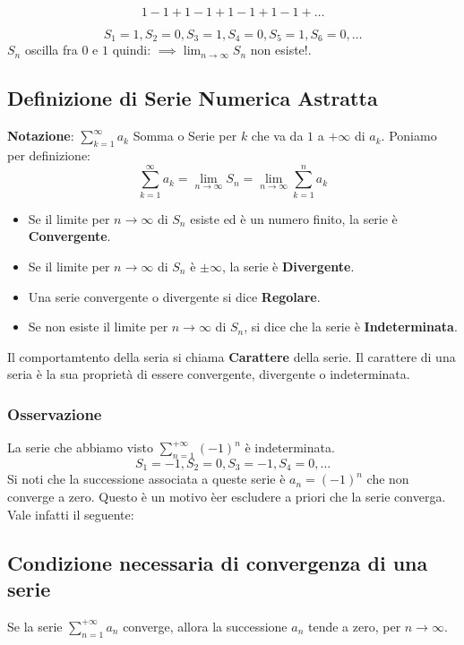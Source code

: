 \documentclass[../../main.tex]{subfiles}
\begin{document}
\[
    1-1+1-1+1-1+1-1+\ldots
\]

\[
    S_1 = 1, S_2 = 0, S_3 = 1, S_4 = 0, S_5 = 1, S_6 = 0, \ldots
\]
$S_n$ oscilla fra $0$ e $1$ quindi: $\implies \lim_{n\to\infty}S_n$ non esiste!.

\subsection{Definizione di Serie Numerica Astratta}
\textbf{Notazione}: $\sum_{k=1}^\infty a_k$ Somma o Serie per $k$ che va da $1$ a
$+\infty$ di $a_k$. Poniamo per definizione:
\[
    \sum_{k=1}^\infty a_k = \lim_{n\to\infty}S_n = \lim_{n\to\infty}\sum_{k=1}^n a_k
\]

\begin{itemize}
    \item Se il limite per $n\to\infty$ di $S_n$ esiste ed è un numero finito, la serie è
          \textbf{Convergente}.
    \item Se il limite per $n\to\infty$ di $S_n$ è $\pm\infty$, la serie è
          \textbf{Divergente}.
\end{itemize}

\begin{itemize}
    \item Una serie convergente o divergente si dice \textbf{Regolare}.
    \item Se non esiste il limite per $n\to\infty$ di $S_n$, si dice che la serie è
          \textbf{Indeterminata}.
\end{itemize}
Il comportamtento della seria si chiama \textbf{Carattere} della serie. Il
carattere di una seria è la sua proprietà di essere convergente, divergente o
indeterminata.

\subsubsection{Osservazione}
La serie che abbiamo visto $\sum_{n=1}^{+\infty}(-1)^n$ è indeterminata.
\[
    S_1 = -1, S_2 = 0, S_3 = -1, S_4 = 0, \ldots
\]
Si noti che la successione associata a queste serie è $a_n=(-1)^n$ che non
converge a zero. Questo è un motivo èer escludere a priori che la serie
converga. Vale infatti il seguente:

\subsection{Condizione necessaria di convergenza di una serie}
Se la serie $\sum_{n=1}^{+\infty}a_n$ converge, allora la successione $a_n$
tende a zero, per $n\to\infty$.
\end{document}
